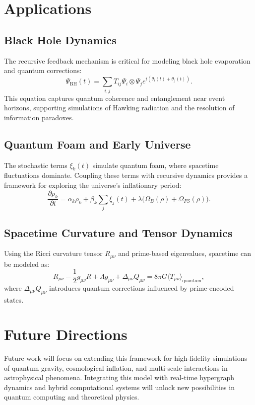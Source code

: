 \documentclass{article}
\theoremstyle{plain}
\begin{document}
\section{Applications}

\subsection{Black Hole Dynamics}
The recursive feedback mechanism is critical for modeling black hole evaporation and quantum corrections:
\begin{equation}
\Psi_{\text{BH}}(t) = \sum_{i,j} T_{ij} \Psi_i \otimes \Psi_j e^{i(\theta_i(t) + \theta_j(t))}.
\end{equation}
This equation captures quantum coherence and entanglement near event horizons, supporting simulations of Hawking radiation and the resolution of information paradoxes.

\subsection{Quantum Foam and Early Universe}
The stochastic terms $\xi_k(t)$ simulate quantum foam, where spacetime fluctuations dominate. Coupling these terms with recursive dynamics provides a framework for exploring the universe's inflationary period:
\begin{equation}
\frac{\partial \rho_k}{\partial t} = \alpha_k \rho_k + \beta_k \sum_j \xi_j(t) + \lambda \big(\Omega_B(\rho) + \Omega_{FS}(\rho)\big).
\end{equation}

\subsection{Spacetime Curvature and Tensor Dynamics}
Using the Ricci curvature tensor $R_{\mu \nu}$ and prime-based eigenvalues, spacetime can be modeled as:
\begin{equation}
R_{\mu \nu} - \frac{1}{2} g_{\mu \nu} R + \Lambda g_{\mu \nu} + \Delta_{\mu \nu} Q_{\mu \nu} = 8 \pi G \langle T_{\mu \nu} \rangle_{\text{quantum}},
\end{equation}
where $\Delta_{\mu \nu} Q_{\mu \nu}$ introduces quantum corrections influenced by prime-encoded states.

\section{Future Directions}
Future work will focus on extending this framework for high-fidelity simulations of quantum gravity, cosmological inflation, and multi-scale interactions in astrophysical phenomena. Integrating this model with real-time hypergraph dynamics and hybrid computational systems will unlock new possibilities in quantum computing and theoretical physics.
\end{document}
